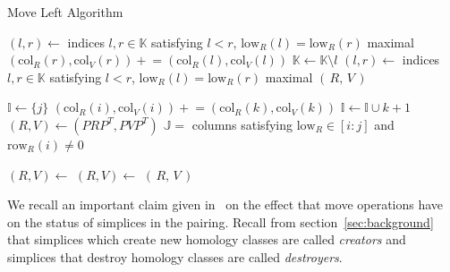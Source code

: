 \documentclass[sn-mathphys]{sn-jnl}
\begin{document}
\begin{algorithm}[!htb]
	\caption{Move Left Algorithm}\label{alg:ml}
    \begin{algorithmic}[1]
            \State $(l, r) \gets $ indices $l, r \in \mathbb{K}$ satisfying $l < r$, $\mathrm{low}_R(l) = \mathrm{low}_R(r)$ maximal 
            	\State $(\mathrm{col}_R(r), \mathrm{col}_V(r)) \mathrel{+}= (\mathrm{col}_R(l), \mathrm{col}_V(l))$
            	\State $\mathbb{K} \gets \mathbb{K} \setminus l$
            	\State $(l, r) \gets $ indices $l, r \in \mathbb{K}$ satisfying $l < r$, $\mathrm{low}_R(l) = \mathrm{low}_R(r)$ maximal
            \EndWhile
        	\State \Return $(\, R, \, V \, )$
        \EndFunction
    \end{algorithmic}
    
    \begin{algorithmic}[1]
        	\State $\mathbb{I} \gets \{ j \}$
            	\State $(\mathrm{col}_R(i), \mathrm{col}_V(i)) \mathrel{+}= (\mathrm{col}_R(k), \mathrm{col}_V(k))$
            	\State $\mathbb{I} \gets \mathbb{I} \cup k + 1 $
            \EndWhile
            \State $(R, V) \gets (P R P^T, P V P^T)$
            \State $\mathbb{J} = $ columns satisfying $\mathrm{low}_R \in [i:j]$ and $\mathrm{row}_R(i) \neq 0$ %

            \State $(R, V) \gets$ 
            \State $(R, V) \gets$ 
			\State \Return $(\, R, \, V\,)$
        \EndFunction
    \end{algorithmic}

\end{algorithm}
We recall an important claim given in~\cite{busaryev2010tracking} on the effect that move operations have on the status of simplices in the pairing. Recall from section~\ref{sec:background} that simplices which create new homology classes are called \emph{creators} and simplices that destroy homology classes are called \emph{destroyers}.
\end{document}
